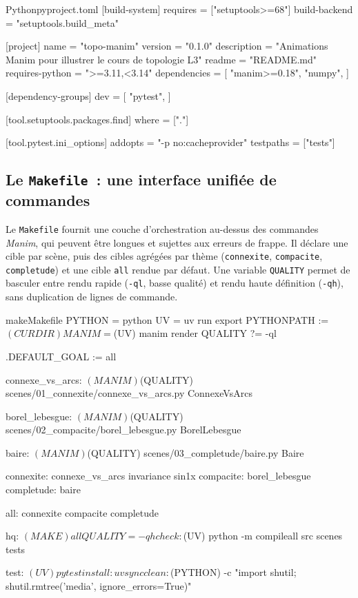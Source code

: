 \documentclass[12pt, a4paper, openany]{report}
\begin{document}
	\begin{codefile}{Python}{pyproject.toml}
[build-system]
requires = ["setuptools>=68"]
build-backend = "setuptools.build_meta"

[project]
name = "topo-manim"
version = "0.1.0"
description = "Animations Manim pour illustrer le cours de topologie L3"
readme = "README.md"
requires-python = ">=3.11,<3.14"
dependencies = [
    "manim>=0.18",
    "numpy",
]

[dependency-groups]
dev = [
    "pytest",
]

[tool.setuptools.packages.find]
where = ["."]

[tool.pytest.ini_options]
addopts = "-p no:cacheprovider"
testpaths = ["tests"]
	\end{codefile}

	\subsection{Le \texttt{Makefile}~: une interface unifiée de commandes}

	Le \texttt{Makefile} fournit une couche d’orchestration au-dessus des commandes \textit{Manim}, qui peuvent être longues et sujettes aux erreurs de frappe. Il déclare une cible par scène, puis des cibles agrégées par thème (\texttt{connexite}, \texttt{compacite}, \texttt{completude}) et une cible \texttt{all} rendue par défaut. Une variable \texttt{QUALITY} permet de basculer entre rendu rapide (\texttt{-ql}, basse qualité) et rendu haute définition (\texttt{-qh}), sans duplication de lignes de commande.

	\begin{codefile}{make}{Makefile}
PYTHON = python
UV = uv run
export PYTHONPATH := $(CURDIR)
MANIM = $(UV) manim render
QUALITY ?= -ql

.DEFAULT_GOAL := all

connexe_vs_arcs:
	$(MANIM) $(QUALITY) scenes/01_connexite/connexe_vs_arcs.py ConnexeVsArcs

borel_lebesgue:
	$(MANIM) $(QUALITY) scenes/02_compacite/borel_lebesgue.py BorelLebesgue

baire:
	$(MANIM) $(QUALITY) scenes/03_completude/baire.py Baire

connexite: connexe_vs_arcs invariance sin1x
compacite: borel_lebesgue
completude: baire

all: connexite compacite completude

hq:
	$(MAKE) all QUALITY=-qh

check:
	$(UV) python -m compileall src scenes tests

test:
	$(UV) pytest

install:
	uv sync

clean:
	$(PYTHON) -c "import shutil; shutil.rmtree('media', ignore_errors=True)"
	\end{codefile}
\end{document}
